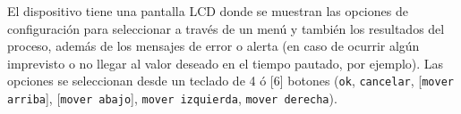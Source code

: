 

El dispositivo tiene una pantalla LCD donde se muestran las opciones de configuración para seleccionar a través de un menú y también los resultados del proceso, además de los mensajes de error o alerta (en caso de ocurrir algún imprevisto o no llegar al valor deseado en el tiempo pautado, por ejemplo). Las opciones se seleccionan desde un teclado de 4 ó [6] botones (\texttt{ok}, \texttt{cancelar}, [\texttt{mover arriba}], [\texttt{mover abajo}], \texttt{mover izquierda}, \texttt{mover derecha}).

